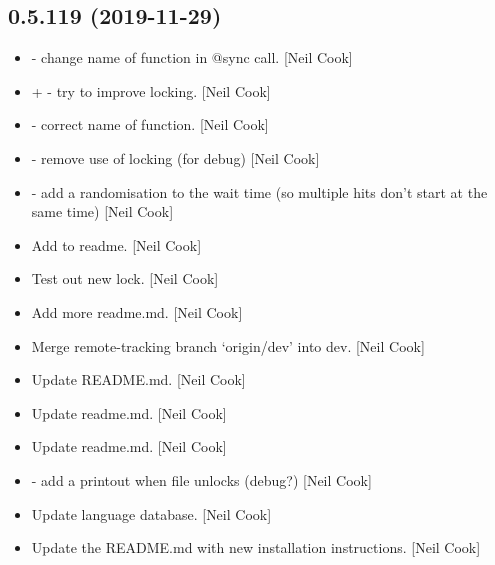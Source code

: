 \documentclass[a4paper,10pt,english]{report}
\begin{document}
\subsection{0.5.119 (2019-11-29)}
\label{\detokenize{misc/changelog:id23}}\begin{itemize}
\item {} 
 - change name of function in @sync call. {[}Neil Cook{]}

\item {} 
 +  - try to improve locking. {[}Neil Cook{]}

\item {} 
 - correct name of function. {[}Neil Cook{]}

\item {} 
 - remove use of locking (for debug) {[}Neil Cook{]}

\item {} 
 - add a randomisation to the wait time (so multiple
hits don’t start at the same time) {[}Neil Cook{]}

\item {} 
Add to readme. {[}Neil Cook{]}

\item {} 
Test out new lock. {[}Neil Cook{]}

\item {} 
Add more readme.md. {[}Neil Cook{]}

\item {} 
Merge remote-tracking branch ‘origin/dev’ into dev. {[}Neil Cook{]}

\item {} 
Update README.md. {[}Neil Cook{]}

\item {} 
Update readme.md. {[}Neil Cook{]}

\item {} 
Update readme.md. {[}Neil Cook{]}

\item {} 
 - add a printout when file unlocks (debug?) {[}Neil Cook{]}

\item {} 
Update language database. {[}Neil Cook{]}

\item {} 
Update the README.md with new installation instructions. {[}Neil Cook{]}


\end{itemize}
\end{document}
